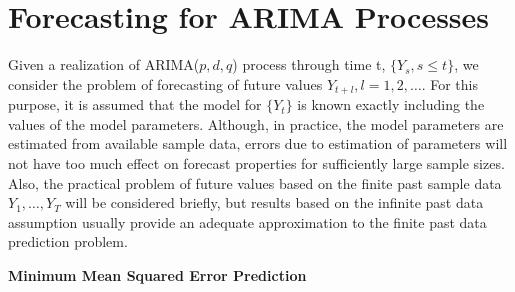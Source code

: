 \section{Forecasting for ARIMA Processes}


Given a realization of ARIMA($p,d,q$) process through time t, $\{ Y_s, s \leq t \}$, we consider the problem of forecasting of future values $Y_{t+l}, l = 1,2, \ldots$. For this purpose, it is assumed that the model for $\{ Y_t \}$ is known exactly including the values of the model parameters. Although, in practice, the model parameters are estimated from available sample data, errors due to estimation of parameters will not have too much effect on forecast properties for sufficiently large sample sizes. Also, the practical problem of future values based on the finite past sample data $Y_1, \ldots, Y_T$ will be considered briefly, but results based on the infinite past data assumption usually provide an adequate approximation to the finite past data prediction problem. \twomedskip


\noindent \textbf{Minimum Mean Squared Error Prediction} \twomedskip



